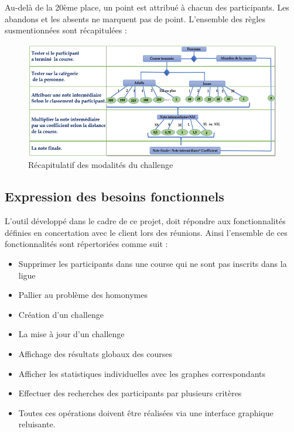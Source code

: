 	\newpage
	Au-delà de la 20ème place, un point est attribué à chacun des participants. Les abandons et les absents ne marquent pas de point. 
	L’ensemble des règles susmentionnées sont récapitulées :
	\begin{figure}[!h]
	   \center
	   \includegraphics[scale=0.9]{img/recapitulatif_modalite_challenge.png}
	   \caption {Récapitulatif des modalités du challenge}
	\end{figure}
	
	\newpage
	\subsection{Expression des besoins fonctionnels}
	L’outil développé dans le cadre de ce projet, doit répondre aux fonctionnalités définies en concertation avec le client lors des réunions. Ainsi l’ensemble de ces fonctionnalités sont répertoriées comme suit :
	\begin{itemize} 
	\item Supprimer les participants dans une course qui ne sont pas inscrits dans la ligue	
	\item Pallier au problème des homonymes 
	\item Création d’un challenge
	\item La mise à jour d’un challenge
	\item Affichage des résultats globaux des courses
	\item Afficher les statistiques individuelles avec les graphes correspondants
	\item Effectuer des recherches des participants par plusieurs critères
	\item Toutes ces opérations doivent être réalisées via une interface graphique reluisante.
	\end{itemize} 
	
